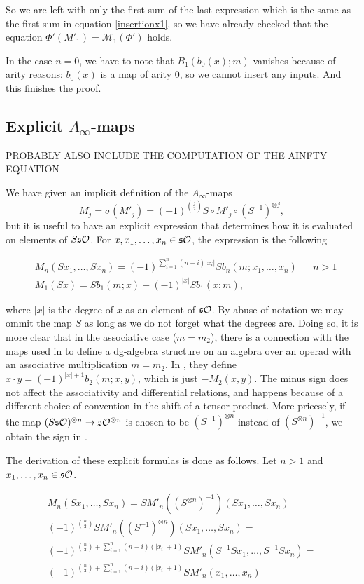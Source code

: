 \documentclass[twoside]{article}
\begin{document}
 So we are left with only the first sum of the last expression which is the same as the first sum in equation \ref{insertionx1}, so we have already checked that the equation $\Phi'(M'_1)=\mathcal{M}_1(\Phi')$ holds. 
  
 In the case $n=0$, we have to note that $B_1(b_0(x);m)$ vanishes because of arity reasons: $b_0(x)$ is a map of arity 0, so we cannot insert any inputs. And this finishes the proof.
\begin{appendices}
\appendix
\gdef\thesection{Appendix \Alph{section}}
\section{Explicit $A_\infty$-maps}
 PROBABLY ALSO INCLUDE THE COMPUTATION OF THE AINFTY EQUATION

We have given an implicit definition of the $A_\infty$-maps \[M_j=\overline{\sigma}(M'_j)=(-1)^{\binom{j}{2}}S\circ M'_j\circ(S^{-1})^{\otimes j},\]
but it is useful to have an explicit expression that determines how it is evaluated on elements of $S\mathfrak{s}{\mathcal O}$. For $x,x_1,\dots,x_n\in\mathfrak{s}{\mathcal O}$, the expression is the following

\begin{align*}
&M_n(Sx_1,\dots, Sx_n)=(-1)^{\sum_{i=1}^n(n-i)|x_i|}Sb_n(m;x_1,\dots, x_n) & & n>1\\
&M_1(Sx)=Sb_1(m;x)-(-1)^{|x|}Sb_1(x;m),
\end{align*}

where $|x|$ is the degree of $x$ as an element of $\mathfrak{s}{\mathcal O}$. By abuse of notation we may ommit the map $S$ as long as we do not forget what the degrees are. Doing so, it is more clear that in the associative case ($m=m_2$), there is a connection with the maps used in \cite{GV} to define a dg-algebra structure on an algebra over an operad with an associative multiplication $m=m_2$. In \cite{GV}, they define $x\cdot y=(-1)^{|x|+1}b_2(m;x,y)$, which is just $-M_2(x,y)$. The minus sign does not affect the associativity and differential relations, and happens because of a different choice of convention in the shift of a tensor product. More pricesely, if the map $(S\mathfrak{s}{\mathcal O})^{\otimes n}\to \mathfrak{s}{\mathcal O}^{\otimes n}$ is chosen to be $(S^{-1})^{\otimes n}$ instead of $(S^{\otimes n})^{-1}$, we obtain the sign in \cite{GV}.

The derivation of these explicit formulas is done as follows. Let $n>1$ and $x_1,\dots, x_n\in \mathfrak{s}{\mathcal O}$. 

\begin{align*}
M_n(Sx_1,\dots, Sx_n)=SM'_n((S^{\otimes n})^{-1})(Sx_1,\dots, Sx_n)\\
(-1)^{\binom{n}{2}}SM'_n((S^{-1})^{\otimes n})(Sx_1,\dots, Sx_n)=\\
(-1)^{\binom{n}{2}+\sum_{i=1}^n(n-i)(|x_i|+1)}SM'_n(S^{-1}Sx_1,\dots, S^{-1}Sx_n)=\\
(-1)^{\binom{n}{2}+\sum_{i=1}^n(n-i)(|x_i|+1)}SM'_n(x_1,\dots,x_n)
\end{align*}


\end{appendices}
\end{document}
